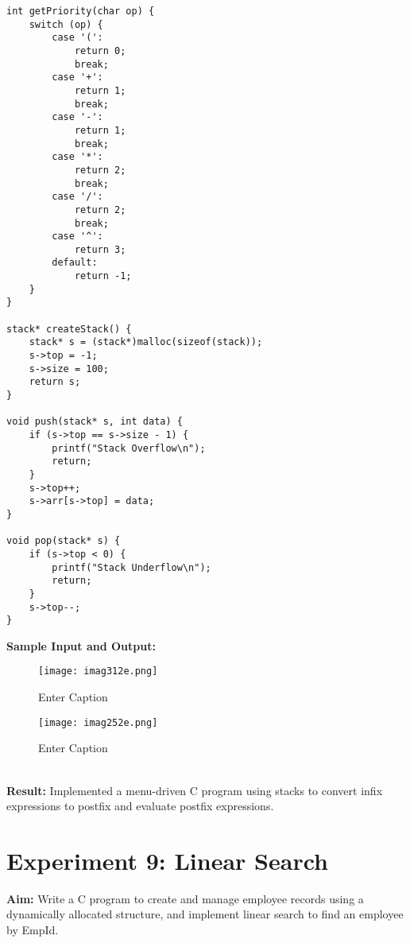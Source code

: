 \documentclass{article}
\begin{document}
\begin{lstlisting}
int getPriority(char op) {
    switch (op) {
        case '(':
            return 0;
            break;
        case '+':
            return 1;
            break;
        case '-':
            return 1;
            break;
        case '*':
            return 2;
            break;
        case '/':
            return 2;
            break;
        case '^':
            return 3;
        default:
            return -1;
    }
}

stack* createStack() {
    stack* s = (stack*)malloc(sizeof(stack));
    s->top = -1;
    s->size = 100;
    return s;
}

void push(stack* s, int data) {
    if (s->top == s->size - 1) {
        printf("Stack Overflow\n");
        return;
    }
    s->top++;
    s->arr[s->top] = data;
}

void pop(stack* s) {
    if (s->top < 0) {
        printf("Stack Underflow\n");
        return;
    }
    s->top--;
}
\end{lstlisting}

\textbf{Sample Input and Output:}
\begin{figure}[h]
    \centering
    \texttt{[image: imag312e.png]}
    \caption{Enter Caption}
    \label{fig:enter-label}
\end{figure}
\begin{figure}[h]
    \centering
    \texttt{[image: imag252e.png]}
    \caption{Enter Caption}
    \label{fig:enter-label}
\end{figure}
\\
\textbf{Result:} Implemented a menu-driven C program using stacks to convert infix expressions to postfix and evaluate postfix expressions.

\clearpage
\section{Experiment 9: Linear Search}
\textbf{Aim:} Write a C program to create and manage employee records using a dynamically allocated structure, and implement linear search to find an employee by EmpId.
\end{document}
